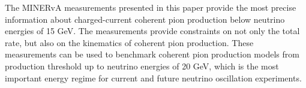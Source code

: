 The MINERvA measurements presented in this paper provide the most precise information about charged-current coherent pion production below neutrino
energies of 15 GeV.  The measurements provide constraints on not only the total rate, but also on the
kinematics of coherent pion production.  These measurements can be used to benchmark coherent pion production models
from production threshold up to neutrino energies of 20 GeV, which is the most important energy regime for current and future neutrino oscillation
experiments.
